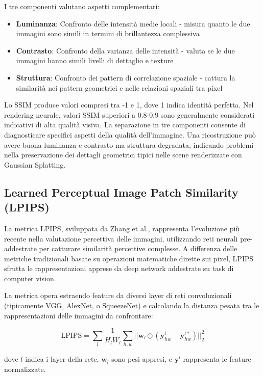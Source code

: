 I tre componenti valutano aspetti complementari:
\begin{itemize}
	\item \textbf{Luminanza}: Confronto delle intensità medie locali - misura quanto le due immagini sono simili in termini di brillantezza complessiva
	\item \textbf{Contrasto}: Confronto della varianza delle intensità - valuta se le due immagini hanno simili livelli di dettaglio e texture
	\item \textbf{Struttura}: Confronto dei pattern di correlazione spaziale - cattura la similarità nei pattern geometrici e nelle relazioni spaziali tra pixel
\end{itemize}

Lo SSIM produce valori compresi tra -1 e 1, dove 1 indica identità perfetta. Nel rendering neurale, valori SSIM superiori a 0.8-0.9 sono generalmente considerati indicativi di alta qualità visiva.\newline
La separazione in tre componenti consente di diagnosticare specifici aspetti della qualità dell'immagine. Una ricostruzione può avere buona luminanza e contrasto ma struttura degradata, indicando problemi nella preservazione dei dettagli geometrici tipici nelle scene renderizzate con Gaussian Splatting.

\subsection{Learned Perceptual Image Patch Similarity (LPIPS)}

La metrica LPIPS, sviluppata da Zhang et al., rappresenta l'evoluzione più recente nella valutazione percettiva delle immagini, utilizzando reti neurali pre-addestrate per catturare similarità percettive complesse. A differenza delle metriche tradizionali basate su operazioni matematiche dirette sui pixel, LPIPS sfrutta le rappresentazioni apprese da deep network addestrate su task di computer vision.

La metrica opera estraendo feature da diversi layer di reti convoluzionali (tipicamente VGG, AlexNet, o SqueezeNet) e calcolando la distanza pesata tra le rappresentazioni delle immagini da confrontare:

\begin{equation}
	\text{LPIPS} = \sum_l \frac{1}{H_l W_l} \sum_{h,w} ||\mathbf{w}_l \odot (\mathbf{y}^l_{hw} - \mathbf{y}^{l*}_{hw})||_2^2
\end{equation}

dove $l$ indica i layer della rete, $\mathbf{w}_l$ sono pesi appresi, e $\mathbf{y}^l$ rappresenta le feature normalizzate.

